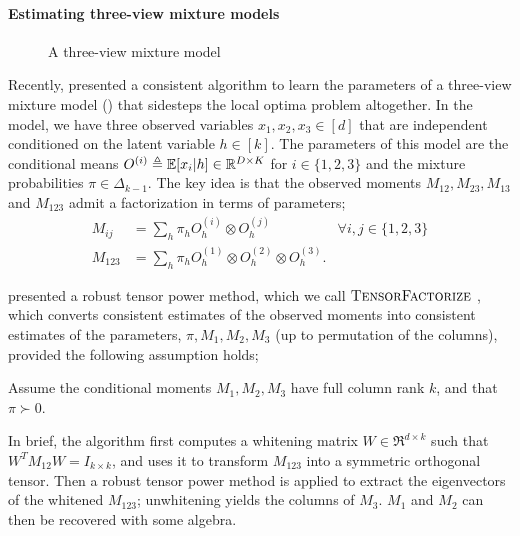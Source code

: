 \paragraph{Estimating three-view mixture models}

\begin{figure}[t]
  \label{fig:three-view}
  \centering
  
  \caption{A three-view mixture model}
\end{figure}

Recently, \citet{anandkumar12moments} presented a consistent algorithm
  to learn the parameters of a three-view mixture model
  () that sidesteps the local optima problem
  altogether. 
In the model, we have three observed variables $x_1, x_2, x_3 \in [d]$
  that are independent conditioned on the latent variable $h \in [k]$. 
  The parameters of this model are the conditional means $O^{(i)} \triangleq
  \mathbb{E}[x_i | h] \in \mathbb{R}^{D \times K}$ for $i \in \{1,2,3\}$ and the mixture probabilities $\pi
  \in \Delta_{k-1}$.
  The key idea is that the observed moments $M_{12}, M_{23}, M_{13}$ and
  $M_{123}$ admit a factorization in terms of parameters;
\begin{align*}
  M_{ij} &= \sum_h \pi_h O^{(i)}_h \otimes O^{(j)}_h & \forall i,j \in \{1,2,3\} \\
  M_{123} &= \sum_h \pi_h O^{(1)}_h \otimes O^{(2)}_h \otimes O^{(3)}_h.
\end{align*}

\citet{anandkumar13tensor} presented a robust tensor power method, which
  we call $\textsc{TensorFactorize}~$, which converts consistent estimates of the observed moments 
  into consistent estimates of the parameters,
  $\pi, M_1, M_2, M_3$ (up to permutation of the columns), provided
  the following assumption holds;

\begin{assumption}
\label{asm:full-rank}
Assume the conditional moments $M_1, M_2, M_3$ have full column rank
  $k$, and that $\pi \succ 0$.
\end{assumption}

In brief, the algorithm first computes a whitening matrix $W \in
  \Re^{d \times k}$ such that $W^T M_{12} W = I_{k \times k}$,
  and uses it to transform $M_{123}$ into a symmetric orthogonal tensor.  
Then a robust tensor power method is applied to extract the eigenvectors
  of the whitened $M_{123}$; unwhitening yields the columns of $M_{3}$.
$M_1$ and $M_2$ can then be recovered with some algebra.


